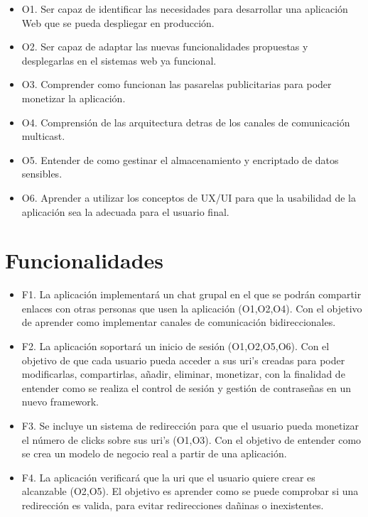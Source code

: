 \documentclass{article}
\begin{document}
\begin{itemize}
    \item O1. Ser capaz de identificar las necesidades para desarrollar una aplicación Web que se pueda despliegar en producción.
    \item O2. Ser capaz de adaptar las nuevas funcionalidades propuestas y desplegarlas en el sistemas web ya funcional.
    \item O3. Comprender como funcionan las pasarelas publicitarias para poder monetizar la aplicación.
    \item O4. Comprensión de las arquitectura detras de los  canales de comunicación multicast.
    \item O5. Entender de como gestinar el almacenamiento y encriptado de datos sensibles.
    \item O6. Aprender a utilizar los conceptos de UX/UI para que la usabilidad de la aplicación sea la adecuada para el usuario final.
\end{itemize}

\section*{Funcionalidades}

\begin{itemize}
    \item F1. La aplicación implementará un chat grupal en el que se podrán compartir enlaces con otras personas que usen la aplicación (O1,O2,O4). Con el objetivo de aprender como implementar canales de comunicación bidireccionales.
    \item F2. La aplicación soportará un inicio de sesión (O1,O2,O5,O6). Con el objetivo de que cada usuario pueda acceder a sus uri's creadas para poder modificarlas, compartirlas, añadir, eliminar, monetizar, con la finalidad de entender como se realiza el control de sesión y gestión de contraseñas en un nuevo framework.
    \item F3. Se incluye un sistema de redirección para que el usuario pueda monetizar el número de clicks sobre sus uri's (O1,O3). Con el objetivo de entender como se crea un modelo de negocio real a partir de una aplicación.
    \item F4. La aplicación verificará que la uri que el usuario quiere crear es alcanzable (O2,O5). El objetivo es aprender como se puede comprobar si una redirección es valida, para evitar redirecciones dañinas o inexistentes.
\end{itemize}
\end{document}
